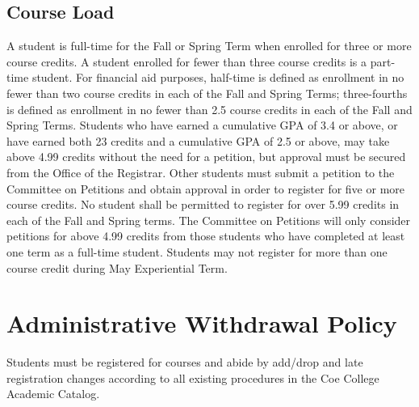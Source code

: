 \documentclass[
  letterpaper,
]{scrbook}
\begin{document}
\subsection{Course Load}\label{course-load}

A student is full-time for the Fall or Spring Term when enrolled for
three or more course credits. A student enrolled for fewer than three
course credits is a part-time student. For financial aid purposes,
half-time is defined as enrollment in no fewer than two course credits
in each of the Fall and Spring Terms; three-fourths is defined as
enrollment in no fewer than 2.5 course credits in each of the Fall and
Spring Terms. Students who have earned a cumulative GPA of 3.4 or above,
or have earned both 23 credits and a cumulative GPA of 2.5 or above, may
take above 4.99 credits without the need for a petition, but approval
must be secured from the Office of the Registrar. Other students must
submit a petition to the Committee on Petitions and obtain approval in
order to register for five or more course credits. No student shall be
permitted to register for over 5.99 credits in each of the Fall and
Spring terms. The Committee on Petitions will only consider petitions
for above 4.99 credits from those students who have completed at least
one term as a full-time student. Students may not register for more than
one course credit during May Experiential Term.

\section{Administrative Withdrawal
Policy}\label{administrative-withdrawal-policy}

Students must be registered for courses and abide by add/drop and late
registration changes according to all existing procedures in the Coe
College Academic Catalog.
\end{document}
